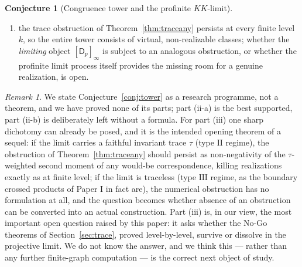 \documentclass[11pt]{amsart}
\numberwithin{equation}{section}
\theoremstyle{definition}
\newtheorem{conjecture}[theorem]{Conjecture}
\theoremstyle{remark}
\newtheorem{remark}[theorem]{Remark}
\newcommand{\Z}{\mathbb{Z}}
\newcommand{\Q}{\mathbb{Q}}
\newcommand{\cH}{\mathcal{H}}
\newcommand{\PGL}{\mathrm{PGL}}
\begin{document}
\begin{conjecture}[Congruence tower and the profinite $KK$-limit]
\begin{enumerate}
\begin{itemize}
ideal of any finitely generated torsion $\Z_p[[T]]$-module. \emph{The naive
$\Z_p[[T]]$-form of this conjecture, including the tentative identification of the
Ihara variable $u$ with $1+T$ proposed in an earlier draft, is therefore withdrawn as
refuted in shape by its own model.} What we conjecture in its place is that the correct
base object for the congruence tower is the Iwahori--Hecke algebra
$\cH(\PGL_2(\Q_p),\mathcal I)$ of the tower, acting through the degeneracy
correspondences, with the finite invariants governed by a characteristic ideal over
that non-commutative base, and the observed $-k$ term arising as an Euler-characteristic
correction --- the removal of one Eisenstein rank per level --- external to the module
invariants proper. We do not know the correct precise formulation, and we prefer to say
so rather than to state a formula the data has already falsified;
\end{itemize}
\item[(iii)] the trace obstruction of Theorem~\ref{thm:traceany} persists at every finite
level $k$, so the entire tower consists of virtual, non-realizable classes; whether the
\emph{limiting} object $[\mathsf D_p]_\infty$ is subject to an analogous obstruction, or
whether the profinite limit process itself provides the missing room for a genuine
realization, is open.
\end{enumerate}
\end{conjecture}

\begin{remark}
We state Conjecture~\ref{conj:tower} as a research programme, not a theorem, and we have
proved none of its parts; part (ii-a) is the best supported, part (ii-b) is deliberately
left without a formula. For part (iii) one sharp dichotomy can already be posed, and it
is the intended opening theorem of a sequel: if the limit carries a faithful invariant
trace $\tau$ (type $\mathrm{II}$ regime), the obstruction of
Theorem~\ref{thm:traceany} should persist as non-negativity of the $\tau$-weighted
second moment of any would-be correspondence, killing realizations exactly as at finite
level; if the limit is traceless (type $\mathrm{III}$ regime, as the boundary crossed
products of Paper I in fact are), the numerical obstruction has no formulation at all,
and the question becomes whether absence of an obstruction can be converted into an
actual construction. Part (iii) is, in our view, the most important open
question raised by this paper: it asks whether the No-Go theorems of
Section~\ref{sec:trace}, proved level-by-level, survive or dissolve in the projective
limit. We do not know the answer, and we think this --- rather than any further
finite-graph computation --- is the correct next object of study.
\end{remark}
\end{document}
